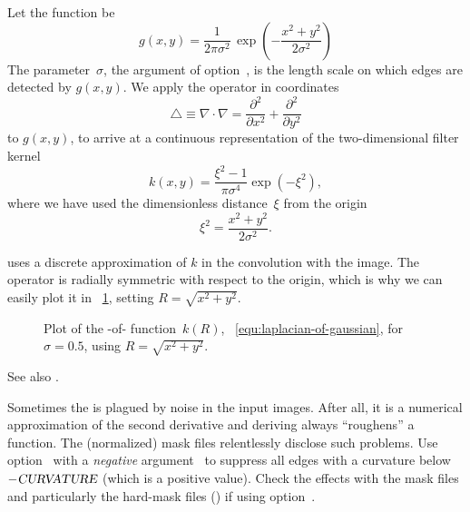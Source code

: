 Let the  function be
\[
    g(x, y) =
    \frac{1}{2 \pi \sigma^2} \,
    {\exp\left(-\frac{x^2 + y^2}{2 \sigma^2}\right)}
\]
\noindent The parameter~$\sigma$, the argument of option~, is the
length scale on which edges are detected by $g(x, y)$.  We apply the 
operator in  coordinates
\[
    \bigtriangleup \equiv \nabla \cdot \nabla =
    \frac{\partial^2}{\partial x^2} + \frac{\partial^2}{\partial y^2}
\]
\noindent to $g(x, y)$, to arrive at a continuous representation of the two-dimensional filter
kernel
\begin{equation}\label{equ:laplacian-of-gaussian}
    k(x, y) = \frac{\xi^2 - 1}{\pi \sigma^4} \exp(-\xi^2),
\end{equation}
\noindent where we have used the dimensionless distance~$\xi$ from the origin
\[
    \xi^2 = \frac{x^2 + y^2}{2 \sigma^2}.
\]

\App{} uses a discrete approximation of $k$ in the convolution with the image.  The operator is
radially symmetric with respect to the origin, which is why we can easily plot it in
\figureName~\ref{fig:laplacian-of-gaussian}, setting $R = \sqrt{x^2 + y^2}$.


\begin{figure}[htbp]
  \ifreferencemanual\begin{maxipage}\fi
  \centering
  \ifreferencemanual\end{maxipage}\fi

  \caption[-of-]{\label{fig:laplacian-of-gaussian}%
    Plot of the -of- function~$k(R)$,
    \equationabbr~\ref{equ:laplacian-of-gaussian}, for $\sigma = 0.5$, using $R = \sqrt{x^2 +
      y^2}$.}
\end{figure}


\noindent See also .

Sometimes the  is plagued by noise in the input images.  After all, it is a
numerical approximation of the second derivative and deriving always ``roughens'' a function.
The (normalized) mask files relentlessly disclose such problems.  Use
option~ with a \emph{negative} argument~ to
suppress all edges with a curvature below $-\textsl{CURVATURE}$ (which is a positive value).
Check the effects with the mask files and particularly the hard-mask files
() if using option~.

